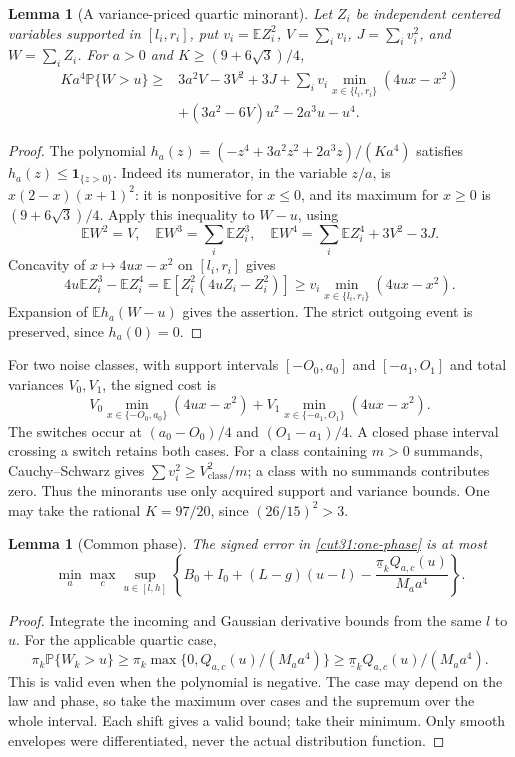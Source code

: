 \documentclass[11pt,a4paper]{article}
\numberwithin{equation}{section}
\newtheorem{lemma}[theorem]{Lemma}
\theoremstyle{definition}
\theoremstyle{remark}
\newcommand{\E}{\mathbb E}
\newcommand{\Pp}{\mathbb P}
\begin{document}
\begin{lemma}[A variance-priced quartic minorant]\label{cut31:quartic:refined}
Let \(Z_i\) be independent centered variables supported in
\([l_i,r_i]\), put \(v_i=\E Z_i^2\),
\(V=\sum_i v_i\), \(J=\sum_i v_i^2\), and \(W=\sum_i Z_i\).
For \(a>0\) and \(K\ge(9+6\sqrt3)/4\),
\begin{align*}
 K a^4\Pp\{W>u\}\ge{}&3a^2V-3V^2+3J
 +\sum_i v_i\min_{x\in\{l_i,r_i\}}(4ux-x^2)\\
 &+(3a^2-6V)u^2-2a^3u-u^4.
\end{align*}
\end{lemma}
\begin{proof}
The polynomial \(h_a(z)=(-z^4+3a^2z^2+2a^3z)/(Ka^4)\)
satisfies \(h_a(z)\le\mathbf1_{\{z>0\}}\).
Indeed its numerator, in the variable \(z/a\), is
\(x(2-x)(x+1)^2\): it is nonpositive for \(x\le0\),
and its maximum for \(x\ge0\) is \((9+6\sqrt3)/4\).
Apply this inequality to \(W-u\), using
\[
 \E W^2=V,\quad \E W^3=\sum_i\E Z_i^3,\quad
 \E W^4=\sum_i\E Z_i^4+3V^2-3J.
\]
Concavity of \(x\mapsto4ux-x^2\) on \([l_i,r_i]\) gives
\[
 4u\E Z_i^3-\E Z_i^4
 =\E[Z_i^2(4uZ_i-Z_i^2)]
 \ge v_i\min_{x\in\{l_i,r_i\}}(4ux-x^2).
\]
Expansion of \(\E h_a(W-u)\) gives the assertion.
The strict outgoing event is preserved, since \(h_a(0)=0\).
\end{proof}

For two noise classes, with support intervals \([-O_0,a_0]\)
and \([-a_1,O_1]\) and total variances \(V_0,V_1\), the signed
cost is
\[
 V_0\min_{x\in\{-O_0,a_0\}}(4ux-x^2)
 +V_1\min_{x\in\{-a_1,O_1\}}(4ux-x^2).
\]
The switches occur at \((a_0-O_0)/4\) and \((O_1-a_1)/4\).
A closed phase interval crossing a switch retains both cases.
For a class containing \(m>0\) summands, Cauchy--Schwarz gives
\(\sum v_i^2\ge V_{\mathrm{class}}^2/m\); a class with no summands
contributes zero. Thus the minorants use only acquired support
and variance bounds. One may take the rational \(K=97/20\),
since \((26/15)^2>3\).

\begin{lemma}[Common phase]\label{cut31:common-phase}
The signed error in \eqref{cut31:one-phase} is at most
\[
 \min_a\max_c\sup_{u\in[l,h]}
 \left\{B_0+I_0+(L-g)(u-l)
       -\frac{\underline\pi_k Q_{a,c}(u)}{M_a a^4}\right\}.
\]
\end{lemma}
\begin{proof}
Integrate the incoming and Gaussian derivative bounds from the
same \(l\) to \(u\). For the applicable quartic case,
\[
 \pi_k\Pp\{W_k>u\}
 \ge\pi_k\max\{0,Q_{a,c}(u)/(M_a a^4)\}
 \ge\underline\pi_k Q_{a,c}(u)/(M_a a^4).
\]
This is valid even when the polynomial is negative. The case may
depend on the law and phase, so take the maximum over cases and
the supremum over the whole interval. Each shift gives a valid
bound; take their minimum. Only smooth envelopes were
differentiated, never the actual distribution function.
\end{proof}
\end{document}
